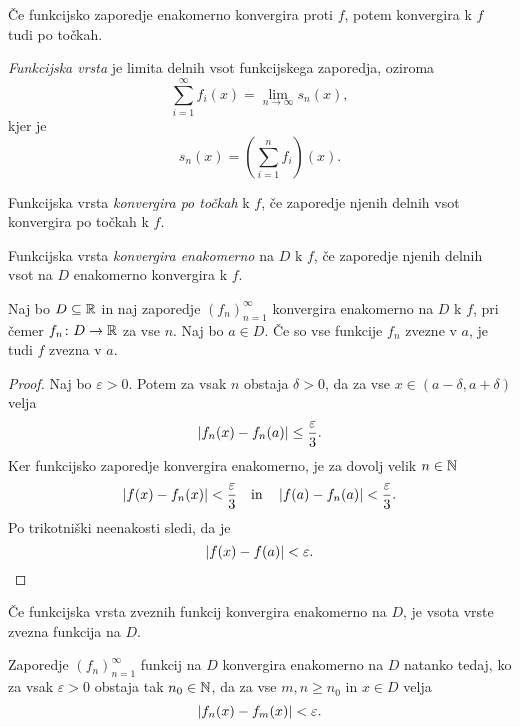 \documentclass[12pt, a4paper]{article}
\begin{document}
\begin{posledica}
Če funkcijsko zaporedje enakomerno konvergira proti $f$, potem konvergira k $f$ tudi po točkah.
\end{posledica}

\begin{definicija}
\emph{Funkcijska vrsta} je limita delnih vsot funkcijskega zaporedja, oziroma
\[
\sum_{i=1}^\infty f_i(x)=\lim_{n\to\infty} s_n(x),
\]
kjer je
\[
s_n(x)=\left(\sum_{i=1}^n f_i\right)(x).
\]
\end{definicija}

\begin{definicija}
Funkcijska vrsta \emph{konvergira po točkah} k $f$, če zaporedje njenih delnih vsot konvergira po točkah k $f$.
\end{definicija}

\begin{definicija}
Funkcijska vrsta \emph{konvergira enakomerno} na $D$ k $f$, če zaporedje njenih delnih vsot na $D$ enakomerno konvergira k $f$.
\end{definicija}

\begin{izrek}
Naj bo $D\subseteq\mathbb{R}$ in naj zaporedje $(f_n)_{n=1}^\infty$ konvergira enakomerno na $D$ k $f$, pri čemer $f_n\colon D\to\mathbb{R}$ za vse $n$. Naj bo $a\in D$. Če so vse funkcije $f_n$ zvezne v $a$, je tudi $f$ zvezna v $a$.
\end{izrek}

\begin{proof}
Naj bo $\varepsilon>0$. Potem za vsak $n$ obstaja $\delta>0$, da za vse $x\in(a-\delta,a+\delta)$ velja
\[
\left\lvert f_n(x)-f_n(a)\right\rvert\leq \frac{\varepsilon}{3}.
\]
Ker funkcijsko zaporedje konvergira enakomerno, je za dovolj velik $n\in\mathbb{N}$
\[
\left\lvert f(x)-f_n(x)\right\rvert<\frac{\varepsilon}{3}\quad\text{in}\quad\left\lvert f(a)-f_n(a)\right\rvert<\frac{\varepsilon}{3}.
\]
Po trikotniški neenakosti sledi, da je
\[
\left\lvert f(x)-f(a)\right\rvert<\varepsilon.\qedhere
\]
\end{proof}

\begin{posledica}
Če funkcijska vrsta zveznih funkcij konvergira enakomerno na $D$, je vsota vrste zvezna funkcija na $D$.
\end{posledica}

\begin{izrek}
Zaporedje $(f_n)_{n=1}^\infty$ funkcij na $D$ konvergira enakomerno na $D$ natanko tedaj, ko za vsak $\varepsilon>0$ obstaja tak $n_0\in\mathbb{N}$, da za vse $m,n\geq n_0$ in $x\in D$ velja
\[
\left\lvert f_n(x)-f_m(x)\right\rvert<\varepsilon.
\]
\end{izrek}
\end{document}
